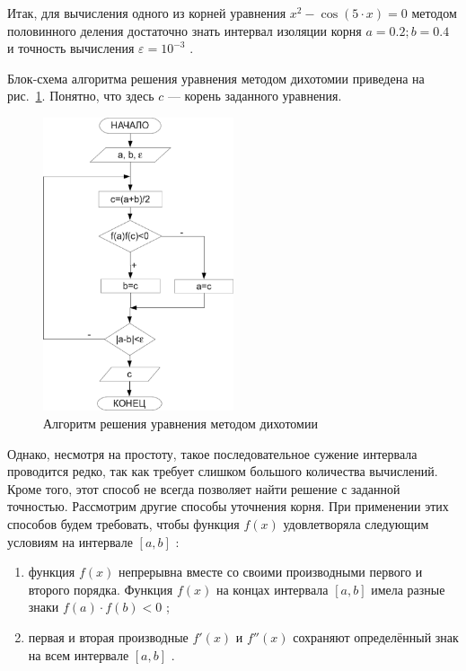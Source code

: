 Итак, для вычисления одного из корней уравнения  $x^2-\cos (5\cdot x)=0$  методом половинного деления достаточно знать
интервал изоляции корня  $a=0.2;b=0.4$  и точность вычисления  $\varepsilon=10^{-3}$ . 

Блок-схема алгоритма решения уравнения методом дихотомии приведена на рис.~\ref{ch04:refDrawing3}. 
Понятно, что здесь  $c$  --- корень заданного уравнения.

\begin{figure}[htb]
\begin{center}
\includegraphics[width=0.5\textwidth]{img/ris_4_4}
\caption{Алгоритм решения уравнения методом дихотомии}
\label{ch04:refDrawing3}
\end{center}
\end{figure}

Однако, несмотря на простоту, такое последовательное сужение интервала проводится редко, так как требует слишком
большого количества вычислений. Кроме того, этот способ не всегда позволяет найти решение с заданной точностью.
Рассмотрим другие способы уточнения корня. При применении этих способов будем требовать, чтобы функция  $f(x)$ 
удовлетворяла следующим условиям на интервале  $[a,b]$ :
\begin{enumerate}
\item функция  $f(x)$  непрерывна вместе со своими производными первого и второго порядка. Функция  $f(x)$  на концах
интервала  $[a,b]$  имела разные знаки  $f(a)\cdot f(b)<0$ ;
\item первая и вторая производные  $f'(x)$  и  $f''(x)$ сохраняют определённый
знак на всем интервале  $[a,b]$ .
\end{enumerate}


